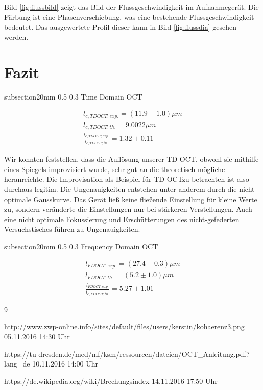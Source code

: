 \documentclass[german, %
parskip=full, %
bibliography=totoc, %
]{scrartcl}
\makeatletter
\renewcommand\subsection{\@startsection 
   {subsection}{2}{0mm}%
   {0.5\baselineskip}%
   {0.3\baselineskip}%
   {\bfseries\sffamily\large}%
   }
\makeatother
\begin{document}
Bild \ref{fig:flussbild} zeigt das Bild der Flussgeschwindigkeit im Aufnahmegerät. Die Färbung ist eine Phasenverschiebung, was eine bestehende Flussgeschwindigkeit bedeutet. Das ausgewertete Profil dieser kann in Bild \ref{fig:flussdia} gesehen werden.

\section{Fazit}

\subsection{Time Domain OCT}

\begin{align*}
l_{c, TD OCT; exp.} = (11.9 \pm 1.0) \mu m \\
l_{c, TD OCT; th.} = 9.0022 \mu m \\
\frac{l_{c, TD OCT; exp.}}{l_{c, TD OCT; th.}} = 1.32 \pm 0.11
\end{align*}

Wir konnten feststellen, dass die Auflösung unserer TD OCT, obwohl sie mithilfe eines Spiegels improvisiert wurde, sehr gut an die theoretisch mögliche heranreichte. Die Improvisation als Beispiel für TD OCTzu betrachten ist also durchaus legitim. 
Die Ungenauigkeiten entstehen unter anderem durch die nicht optimale Gausskurve. Das Gerät ließ keine fließende Einstellung für kleine Werte zu, sondern veränderte die Einstellungen nur bei stärkeren Verstellungen. Auch eine nicht optimale Fokussierung und Erschütterungen des nicht-gefederten Versuchstisches führen zu Ungenauigkeiten.

\subsection{Frequency Domain OCT}

\begin{align*}
l_{FD OCT; exp.} = (27.4 \pm 0.3) \mu m \\
l_{FD OCT; th.} = (5.2 \pm 1.0) \mu m \\
\frac{l_{FD OCT; exp.}}{l_{c, FD OCT; th.}} = 5.27 \pm 1.01
\end{align*}








\begin{thebibliography}{9}

  http://www.zwp-online.info/sites/default/files/users/kerstin/kohaerenz3.png
	05.11.2016
	14:30 Uhr

  https://tu-dresden.de/med/mf/ksm/ressourcen/dateien/OCT\_Anleitung.pdf?lang=de
	10.11.2016
	14:00 Uhr
	
  https://de.wikipedia.org/wiki/Brechungsindex
	14.11.2016
	17:50 Uhr

\end{thebibliography}
\end{document}
